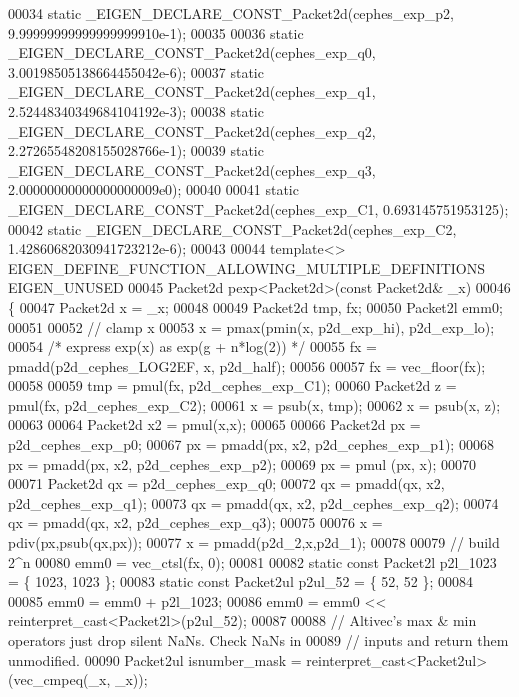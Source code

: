 \begin{DoxyCode}
00034 \textcolor{keyword}{static} \_EIGEN\_DECLARE\_CONST\_Packet2d(cephes\_exp\_p2, 9.99999999999999999910e-1);
00035 
00036 \textcolor{keyword}{static} \_EIGEN\_DECLARE\_CONST\_Packet2d(cephes\_exp\_q0, 3.00198505138664455042e-6);
00037 \textcolor{keyword}{static} \_EIGEN\_DECLARE\_CONST\_Packet2d(cephes\_exp\_q1, 2.52448340349684104192e-3);
00038 \textcolor{keyword}{static} \_EIGEN\_DECLARE\_CONST\_Packet2d(cephes\_exp\_q2, 2.27265548208155028766e-1);
00039 \textcolor{keyword}{static} \_EIGEN\_DECLARE\_CONST\_Packet2d(cephes\_exp\_q3, 2.00000000000000000009e0);
00040 
00041 \textcolor{keyword}{static} \_EIGEN\_DECLARE\_CONST\_Packet2d(cephes\_exp\_C1, 0.693145751953125);
00042 \textcolor{keyword}{static} \_EIGEN\_DECLARE\_CONST\_Packet2d(cephes\_exp\_C2, 1.42860682030941723212e-6);
00043 
00044 \textcolor{keyword}{template}<> EIGEN\_DEFINE\_FUNCTION\_ALLOWING\_MULTIPLE\_DEFINITIONS EIGEN\_UNUSED
00045 Packet2d pexp<Packet2d>(\textcolor{keyword}{const} Packet2d& \_x)
00046 \{
00047   Packet2d x = \_x;
00048 
00049   Packet2d tmp, fx;
00050   Packet2l emm0;
00051 
00052   \textcolor{comment}{// clamp x}
00053   x = pmax(pmin(x, p2d\_exp\_hi), p2d\_exp\_lo);
00054   \textcolor{comment}{/* express exp(x) as exp(g + n*log(2)) */}
00055   fx = pmadd(p2d\_cephes\_LOG2EF, x, p2d\_half);
00056 
00057   fx = vec\_floor(fx);
00058 
00059   tmp = pmul(fx, p2d\_cephes\_exp\_C1);
00060   Packet2d z = pmul(fx, p2d\_cephes\_exp\_C2);
00061   x = psub(x, tmp);
00062   x = psub(x, z);
00063 
00064   Packet2d x2 = pmul(x,x);
00065 
00066   Packet2d px = p2d\_cephes\_exp\_p0;
00067   px = pmadd(px, x2, p2d\_cephes\_exp\_p1);
00068   px = pmadd(px, x2, p2d\_cephes\_exp\_p2);
00069   px = pmul (px, x);
00070 
00071   Packet2d qx = p2d\_cephes\_exp\_q0;
00072   qx = pmadd(qx, x2, p2d\_cephes\_exp\_q1);
00073   qx = pmadd(qx, x2, p2d\_cephes\_exp\_q2);
00074   qx = pmadd(qx, x2, p2d\_cephes\_exp\_q3);
00075 
00076   x = pdiv(px,psub(qx,px));
00077   x = pmadd(p2d\_2,x,p2d\_1);
00078 
00079   \textcolor{comment}{// build 2^n}
00080   emm0 = vec\_ctsl(fx, 0);
00081 
00082   \textcolor{keyword}{static} \textcolor{keyword}{const} Packet2l p2l\_1023 = \{ 1023, 1023 \};
00083   \textcolor{keyword}{static} \textcolor{keyword}{const} Packet2ul p2ul\_52 = \{ 52, 52 \};
00084 
00085   emm0 = emm0 + p2l\_1023;
00086   emm0 = emm0 << reinterpret\_cast<Packet2l>(p2ul\_52);
00087 
00088   \textcolor{comment}{// Altivec's max & min operators just drop silent NaNs. Check NaNs in }
00089   \textcolor{comment}{// inputs and return them unmodified.}
00090   Packet2ul isnumber\_mask = \textcolor{keyword}{reinterpret\_cast<}Packet2ul\textcolor{keyword}{>}(vec\_cmpeq(\_x, \_x));

\end{DoxyCode}
